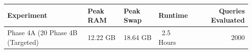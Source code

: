 \begin{tabular}{llllr}
\toprule
Experiment & Peak RAM & Peak Swap & Runtime & Queries Evaluated \\
\midrule
Phase 4A (20%
Phase 4B (Targeted) & 12.22 GB & 18.64 GB & ~2.5 Hours & 2000 \\
\bottomrule
\end{tabular}
